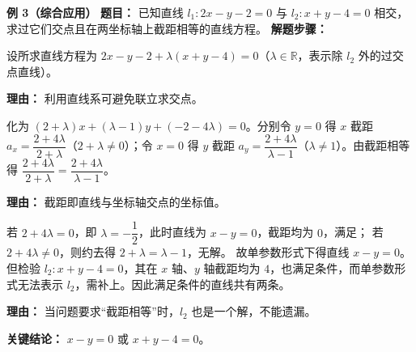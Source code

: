 \begin{examplebox}
	\medskip
	\textbf{\textcolor{CExample}{例 3（综合应用）}}
	\textbf{\textcolor{CExample}{题目：}}
	已知直线 $l_1:2x-y-2=0$ 与 $l_2:x+y-4=0$ 相交，求过它们交点且在两坐标轴上截距相等的直线方程。
	\textbf{\textcolor{CExample}{解题步骤：}}
	\begin{description}[style=nextline, leftmargin=2.8em, labelsep=0.5em, itemsep=0.45em]
		\item[\textbf{第一步（设直线系）：}]
			设所求直线方程为 $2x-y-2+\lambda(x+y-4)=0$（$\lambda\in\mathbb{R}$，表示除 $l_2$ 外的过交点直线）。
			\par\textbf{理由：} 利用直线系可避免联立求交点。
		\item[\textbf{第二步（列截距相等条件）：}]
			化为 $(2+\lambda)x+(\lambda-1)y+(-2-4\lambda)=0$。分别令 $y=0$ 得 $x$ 截距 $a_x=\dfrac{2+4\lambda}{2+\lambda}$（$2+\lambda\neq0$）；令 $x=0$ 得 $y$ 截距 $a_y=\dfrac{2+4\lambda}{\lambda-1}$（$\lambda\neq1$）。由截距相等得 $\dfrac{2+4\lambda}{2+\lambda}=\dfrac{2+4\lambda}{\lambda-1}$。
			\par\textbf{理由：} 截距即直线与坐标轴交点的坐标值。
		\item[\textbf{第三步（求解并检验缺漏）：}]
			若 $2+4\lambda=0$，即 $\lambda=-\dfrac12$，此时直线为 $x-y=0$，截距均为 $0$，满足； 若 $2+4\lambda\neq0$，则约去得 $2+\lambda=\lambda-1$，无解。 故单参数形式下得直线 $x-y=0$。但检验 $l_2:x+y-4=0$，其在 $x$ 轴、$y$ 轴截距均为 $4$，也满足条件，而单参数形式无法表示 $l_2$，需补上。因此满足条件的直线共有两条。
			\par\textbf{理由：} 当问题要求“截距相等”时，$l_2$ 也是一个解，不能遗漏。
	\end{description}
	\textbf{\textcolor{CExample}{关键结论：}}
	$\boxed{x-y=0}$ 或 $\boxed{x+y-4=0}$。
\end{examplebox}
